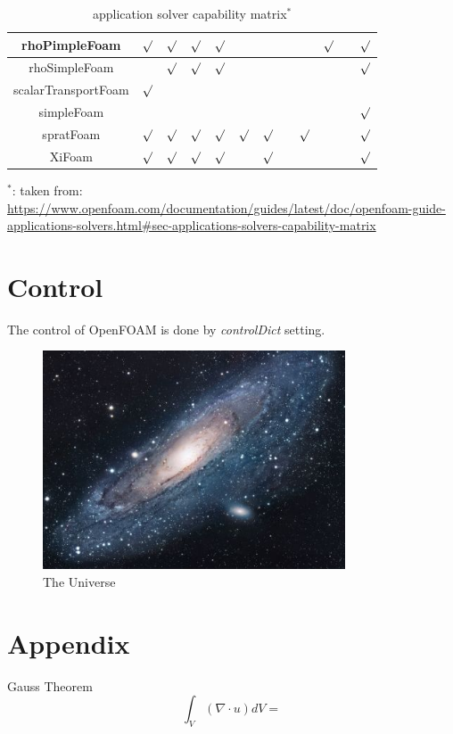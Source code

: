 \documentclass{article}
\begin{document}
\begin{landscape}
\begin{table}[h!]
\begin{tabular}{cccccccccccc}
\hline
rhoPimpleFoam & $\surd$ & $\surd$ & $\surd$ & $\surd$ & & & & & $\surd$ & & $\surd$ \\
\hline
rhoSimpleFoam & & $\surd$ & $\surd$ & $\surd$ & & & & & & &  $\surd$\\
\hline
scalarTransportFoam & $\surd$ & & & & & & & & & & \\
\hline
simpleFoam & & & & & & & & &  & & $\surd$ \\	
\hline
spratFoam & $\surd$ & $\surd$ & $\surd$ & $\surd$ & $\surd$ & $\surd$& & $\surd$ & & & $\surd$ \\
\hline
XiFoam & $\surd$ & $\surd$ & $\surd$ & $\surd$ & & $\surd$ & & & & & $\surd$\\
\hline
\end{tabular}
    \caption{application solver capability matrix$^*$}
    \label{tab:solver compatibility}
\end{table}
$^*$: taken from: 
\url{https://www.openfoam.com/documentation/guides/latest/doc/openfoam-guide-applications-solvers.html#sec-applications-solvers-capability-matrix}

\end{landscape}



\section{Control}
The control of OpenFOAM is done by \textit{controlDict} setting. \citep{adams1995hitchhiker}
 
\begin{figure}[h!]
\centering
\includegraphics[width=0.8\textwidth,natwidth=610,natheight=642]{universe.jpg}
\caption{The Universe}
\label{fig:universe}
\end{figure}

\appendix
\section{Appendix}
Gauss Theorem
\begin{equation}
\int_V(\nabla \cdot u) dV = 
\end{equation}



\end{document}
